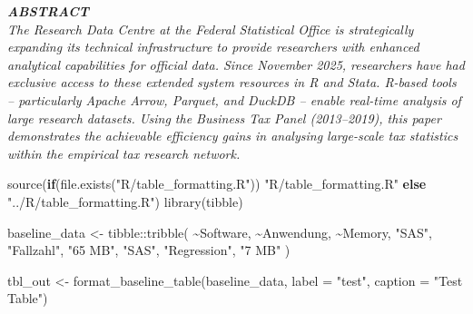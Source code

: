 \documentclass[
  german,
  10pt,
  twoside]{article}
\newenvironment{Shaded}{\begin{snugshade}}{\end{snugshade}}
\newcommand{\AttributeTok}[1]{\textcolor[rgb]{0.40,0.45,0.13}{#1}}
\newcommand{\ControlFlowTok}[1]{\textcolor[rgb]{0.00,0.23,0.31}{\textbf{#1}}}
\newcommand{\FunctionTok}[1]{\textcolor[rgb]{0.28,0.35,0.67}{#1}}
\newcommand{\NormalTok}[1]{\textcolor[rgb]{0.00,0.23,0.31}{#1}}
\newcommand{\OtherTok}[1]{\textcolor[rgb]{0.00,0.23,0.31}{#1}}
\newcommand{\SpecialCharTok}[1]{\textcolor[rgb]{0.37,0.37,0.37}{#1}}
\newcommand{\StringTok}[1]{\textcolor[rgb]{0.13,0.47,0.30}{#1}}
\renewcommand*\contentsname{Inhaltsverzeichnis}
\newcommand\contentsname{Inhaltsverzeichnis}
\begin{document}
\begin{titlepage}
\begin{minipage}[t]{11.8cm}
\vspace{0.3cm}

{\itshape\color{wistaDarkGray}\bfseries\MakeUppercase{Abstract}}\\[0.15cm]
\small\itshape
The Research Data Centre at the Federal Statistical Office is strategically expanding its technical infrastructure to provide researchers with enhanced analytical capabilities for official data. Since November 2025, researchers have had exclusive access to these extended system resources in R and Stata. R-based tools -- particularly Apache Arrow, Parquet, and DuckDB -- enable real-time analysis of large research datasets. Using the Business Tax Panel (2013--2019), this paper demonstrates the achievable efficiency gains in analysing large-scale tax statistics within the empirical tax research network.

\end{minipage}

\vfill

\vspace{0.5cm}
\noindent{}

\end{titlepage}

\pagestyle{fancy}

\renewcommand*\contentsname{Inhaltsverzeichnis}
{
\hypersetup{linkcolor=}
\setcounter{tocdepth}{3}
\tableofcontents
}

\begin{Shaded}
\begin{Highlighting}[]
\FunctionTok{source}\NormalTok{(}\ControlFlowTok{if}\NormalTok{(}\FunctionTok{file.exists}\NormalTok{(}\StringTok{"R/table\_formatting.R"}\NormalTok{)) }\StringTok{"R/table\_formatting.R"} \ControlFlowTok{else} \StringTok{"../R/table\_formatting.R"}\NormalTok{)}
\FunctionTok{library}\NormalTok{(tibble)}

\NormalTok{baseline\_data }\OtherTok{\textless{}{-}}\NormalTok{ tibble}\SpecialCharTok{::}\FunctionTok{tribble}\NormalTok{(}
  \SpecialCharTok{\textasciitilde{}}\NormalTok{Software, }\SpecialCharTok{\textasciitilde{}}\NormalTok{Anwendung, }\SpecialCharTok{\textasciitilde{}}\NormalTok{Memory,}
  \StringTok{"SAS"}\NormalTok{,   }\StringTok{"Fallzahl"}\NormalTok{,   }\StringTok{"65 MB"}\NormalTok{,}
  \StringTok{"SAS"}\NormalTok{,   }\StringTok{"Regression"}\NormalTok{, }\StringTok{"7 MB"}
\NormalTok{)}

\NormalTok{tbl\_out }\OtherTok{\textless{}{-}} \FunctionTok{format\_baseline\_table}\NormalTok{(baseline\_data, }
                                   \AttributeTok{label =} \StringTok{"test"}\NormalTok{,}
                                   \AttributeTok{caption =} \StringTok{"Test Table"}\NormalTok{)}
\end{Highlighting}
\end{Shaded}
\end{document}
